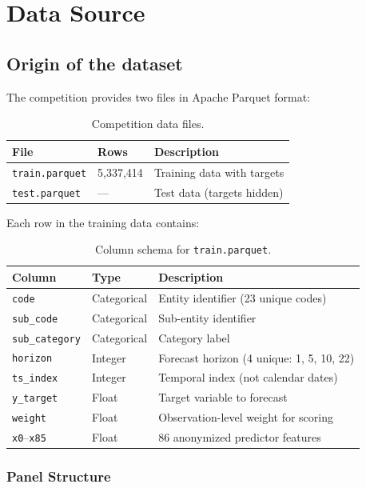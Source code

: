 \section{Data Source}
\label{sec:data_source}

\subsection{Origin of the dataset}
The competition provides two files in Apache Parquet format:

\begin{table}[H]
\centering
\caption{Competition data files.}
\begin{tabular}{lll}
\toprule
\textbf{File} & \textbf{Rows} & \textbf{Description} \\
\midrule
\texttt{train.parquet} & 5,337,414 & Training data with targets \\
\texttt{test.parquet} & --- & Test data (targets hidden) \\
\bottomrule
\end{tabular}
\end{table}

Each row in the training data contains:

\begin{table}[H]
\centering
\caption{Column schema for \texttt{train.parquet}.}
\label{tab:schema}
\begin{tabular}{lll}
\toprule
\textbf{Column} & \textbf{Type} & \textbf{Description} \\
\midrule
\texttt{code} & Categorical & Entity identifier (23 unique codes) \\
\texttt{sub\_code} & Categorical & Sub-entity identifier \\
\texttt{sub\_category} & Categorical & Category label \\
\texttt{horizon} & Integer & Forecast horizon (4 unique: 1, 5, 10, 22) \\
\texttt{ts\_index} & Integer & Temporal index (not calendar dates) \\
\texttt{y\_target} & Float & Target variable to forecast \\
\texttt{weight} & Float & Observation-level weight for scoring \\
\texttt{x0}--\texttt{x85} & Float & 86 anonymized predictor features \\
\bottomrule
\end{tabular}
\end{table}

\subsubsection{Panel Structure}

